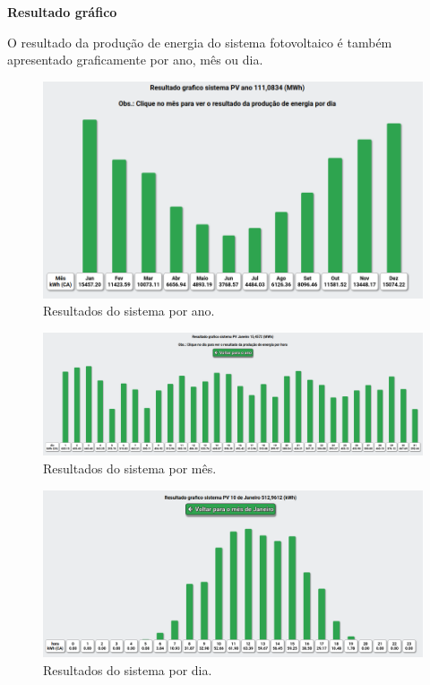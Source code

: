 \newpage
\textbf{Resultado gráfico}

O resultado da produção de energia do sistema fotovoltaico é também apresentado graficamente por ano, mês ou dia.

\begin{figure}[H]
    \centering
    \includegraphics[width=1\textwidth]{./Figuras/modelo5.png}
    \caption{Resultados do sistema por ano.}
   \label{fig:modelo5}
\end{figure}

\begin{figure}[H]
    \centering
    \includegraphics[width=1\textwidth]{./Figuras/modelo6.png}
    \caption{Resultados do sistema por mês.}
   \label{fig:modelo6}
\end{figure}

\begin{figure}[H]
    \centering
    \includegraphics[width=1\textwidth]{./Figuras/modelo7.png}
    \caption{Resultados do sistema por dia.}
   \label{fig:modelo7}
\end{figure}
